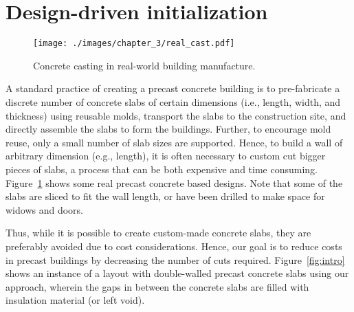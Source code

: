 \begin{figure*}[t!]
\centering
{}
\caption{Interactive floor plan generation by our system based on constrained optimization and precast concrete based construction cost minimization. Concrete slabs that were cut are highlighted in red. }
\label{fig:intro}
\end{figure*}

\section{Design-driven initialization}

\begin{figure}[b!]
\centering
\texttt{[image: ./images/chapter\_3/real\_cast.pdf]}
\caption{Concrete casting in real-world building manufacture.}
\label{fig:realCast}
\end{figure}

A standard practice of creating a precast concrete building is to pre-fabricate a discrete number of concrete slabs of certain dimensions (i.e., length, width, and thickness) using reusable molds, transport the slabs to the construction site, and directly assemble the slabs to form the buildings. Further, to encourage mold reuse, only a small number of slab sizes are supported. Hence, to build a wall of arbitrary dimension (e.g., length), it is often necessary to custom cut bigger pieces of slabs, a process that can be both expensive and time consuming.
%
Figure~\ref{fig:realCast} shows some real precast concrete based designs. Note that some of the slabs are sliced to fit the wall length, or have been drilled to make space for widows and doors.

Thus, while it is possible to create custom-made concrete slabs, they are preferably avoided due to cost considerations. Hence, our goal is to reduce costs in precast buildings by decreasing the number of cuts required. Figure~\ref{fig:intro} shows an instance of a layout with double-walled precast concrete slabs using our approach, wherein the gaps in between the concrete slabs are filled with insulation material (or left void).

